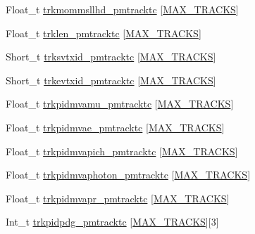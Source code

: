 \begin{DoxyCompactItemize}
\item 
Float\-\_\-t \hyperlink{classanatree_a68586b90e0cfa3d2a08990cb05410d20}{trkmommsllhd\-\_\-pmtracktc} \mbox{[}\hyperlink{anatree__core__v09410002__orig_8h_a327fd4e796e4a0d78947524c96e4362e}{M\-A\-X\-\_\-\-T\-R\-A\-C\-K\-S}\mbox{]}
\item 
Float\-\_\-t \hyperlink{classanatree_acdc8e9ab5e49db76b1ecbd092d1378eb}{trklen\-\_\-pmtracktc} \mbox{[}\hyperlink{anatree__core__v09410002__orig_8h_a327fd4e796e4a0d78947524c96e4362e}{M\-A\-X\-\_\-\-T\-R\-A\-C\-K\-S}\mbox{]}
\item 
Short\-\_\-t \hyperlink{classanatree_ae7c4a4f0fbb6b7a01e50b1747d658fbc}{trksvtxid\-\_\-pmtracktc} \mbox{[}\hyperlink{anatree__core__v09410002__orig_8h_a327fd4e796e4a0d78947524c96e4362e}{M\-A\-X\-\_\-\-T\-R\-A\-C\-K\-S}\mbox{]}
\item 
Short\-\_\-t \hyperlink{classanatree_a1b338a291e643d9837a16123871007aa}{trkevtxid\-\_\-pmtracktc} \mbox{[}\hyperlink{anatree__core__v09410002__orig_8h_a327fd4e796e4a0d78947524c96e4362e}{M\-A\-X\-\_\-\-T\-R\-A\-C\-K\-S}\mbox{]}
\item 
Float\-\_\-t \hyperlink{classanatree_a1db8ef1a0e54ce2eb3c3082411a5ac90}{trkpidmvamu\-\_\-pmtracktc} \mbox{[}\hyperlink{anatree__core__v09410002__orig_8h_a327fd4e796e4a0d78947524c96e4362e}{M\-A\-X\-\_\-\-T\-R\-A\-C\-K\-S}\mbox{]}
\item 
Float\-\_\-t \hyperlink{classanatree_a48bc957c9c6188a3989b1d4aa504860d}{trkpidmvae\-\_\-pmtracktc} \mbox{[}\hyperlink{anatree__core__v09410002__orig_8h_a327fd4e796e4a0d78947524c96e4362e}{M\-A\-X\-\_\-\-T\-R\-A\-C\-K\-S}\mbox{]}
\item 
Float\-\_\-t \hyperlink{classanatree_a4bff7ec858e1fe70ef59d8cb584ff6fb}{trkpidmvapich\-\_\-pmtracktc} \mbox{[}\hyperlink{anatree__core__v09410002__orig_8h_a327fd4e796e4a0d78947524c96e4362e}{M\-A\-X\-\_\-\-T\-R\-A\-C\-K\-S}\mbox{]}
\item 
Float\-\_\-t \hyperlink{classanatree_a7852dd9ddd40910fcf22292953ab0a68}{trkpidmvaphoton\-\_\-pmtracktc} \mbox{[}\hyperlink{anatree__core__v09410002__orig_8h_a327fd4e796e4a0d78947524c96e4362e}{M\-A\-X\-\_\-\-T\-R\-A\-C\-K\-S}\mbox{]}
\item 
Float\-\_\-t \hyperlink{classanatree_a54cbe0b7be68c4480faa489b0ade1c8c}{trkpidmvapr\-\_\-pmtracktc} \mbox{[}\hyperlink{anatree__core__v09410002__orig_8h_a327fd4e796e4a0d78947524c96e4362e}{M\-A\-X\-\_\-\-T\-R\-A\-C\-K\-S}\mbox{]}
\item 
Int\-\_\-t \hyperlink{classanatree_a9e947d81c3dc2d0f00559e64032feddb}{trkpidpdg\-\_\-pmtracktc} \mbox{[}\hyperlink{anatree__core__v09410002__orig_8h_a327fd4e796e4a0d78947524c96e4362e}{M\-A\-X\-\_\-\-T\-R\-A\-C\-K\-S}\mbox{]}\mbox{[}3\mbox{]}

\end{DoxyCompactItemize}
